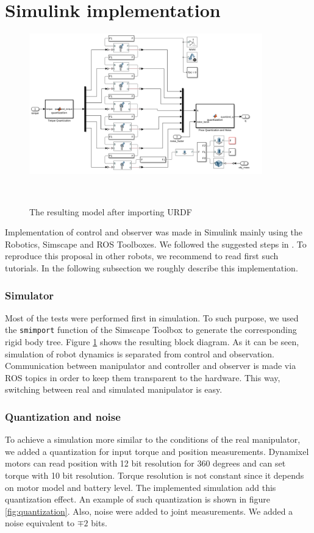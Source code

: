 \documentclass[a4paper, 10pt]{article}
\begin{document}
\section{Simulink implementation}
\label{sec:implementation}
\begin{figure}[h!]
  \centering
  \includegraphics[width=0.9\textwidth]{Figures/ManipulatorModel.png}
  \caption{The resulting model after importing URDF}\
  \label{fig:SimulinkModel}
\end{figure}

Implementation of control and observer was made in Simulink mainly using the Robotics, Simscape and ROS Toolboxes. We followed the suggested steps in \cite{matlab_designing, matlab_trajectory}. To reproduce this proposal in other robots, we recommend to read first such tutorials. In the following subsection we roughly describe this implementation.

\subsubsection*{Simulator}
Most of the tests were performed first in simulation. To such purpose, we used the \texttt{smimport} function of the Simscape Toolbox to generate the corresponding rigid body tree. Figure \ref{fig:SimulinkModel} shows the resulting block diagram. As it can be seen, simulation of robot dynamics is separated from control and observation. Communication between manipulator and controller and observer is made via ROS topics in order to keep them transparent to the hardware. This way, switching between real and simulated manipulator is easy.

\subsubsection*{Quantization and noise}
To achieve a simulation more similar to the conditions of the real manipulator, we added a quantization for input torque and position measurements. Dynamixel motors can read position with 12 bit resolution for 360 degrees and can set torque with 10 bit resolution. Torque resolution is not constant since it depends on motor model and battery level. The implemented simulation add this quantization effect. An example of such quantization is shown in figure \ref{fig:quantization}. Also, noise were added to joint measurements. We added a noise equivalent to $\mp 2$ bits. 
\end{document}
